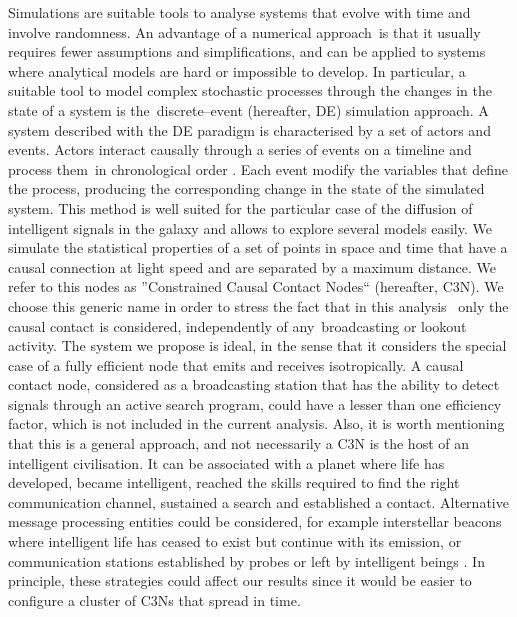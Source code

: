 \documentclass[crop]{CSLB}
\newcommand{\ceti}{C3N}
\newcommand{\cetis}{C3Ns}
\begin{document}
Simulations are suitable tools to analyse systems that evolve with time and
involve randomness.
%
An advantage of a numerical approach is that it usually requires fewer assumptions
and simplifications, and can be applied to systems where analytical models are
hard or impossible to develop.
%
In particular, a suitable tool to model complex stochastic processes through
the changes in the state of a system is the discrete--event (hereafter, DE)
simulation approach.
%
A system described with the DE paradigm is characterised by a set of actors and
events.
%
Actors interact causally through a series of events on a timeline and process
them in chronological order \citep{ptolemaeus_system_2014,
chung_simulation_2003, ross_simulation_2012}.
%
Each event modify the variables that define the process, producing the
corresponding change in the state of the simulated system.
%
This method is well suited for the particular case of the diffusion of
intelligent signals in the galaxy and allows to explore several models easily.
%
We simulate the statistical properties of a set of points in space and time
that have a causal connection at light speed and are separated
by a maximum distance.
%
We refer to this nodes as ''Constrained Causal Contact Nodes``
(hereafter, \ceti{}).
%
We choose this generic name in order to stress the fact that in this analysis 
only the causal contact is considered, independently of any broadcasting or
lookout activity.
%
The system we propose is ideal, in the sense that it considers the special case
of a fully efficient node that emits and receives isotropically.
%
A causal contact node, considered as a broadcasting station that has the
ability to detect signals through an active search program, could have a
lesser than one efficiency factor, which is not included in the current
analysis.
%
Also, it is worth mentioning that this is a general approach, and not
necessarily a \ceti{} is the host of an intelligent civilisation.
%
It can be associated with a planet where life has developed,
became intelligent, reached the skills required to find the right communication
channel, sustained a search and established a contact.
%
Alternative message processing entities could be considered, for example
interstellar beacons where intelligent life has ceased to exist but continue with its
emission, or communication stations established by probes or left by
intelligent beings \citep[see, e.g., ][]{peters_outer_2018,
barlow_galactic_2013}.
%
In principle, these strategies could affect our results since it would be
easier to configure a cluster of \cetis{} that spread in time.
\end{document}
